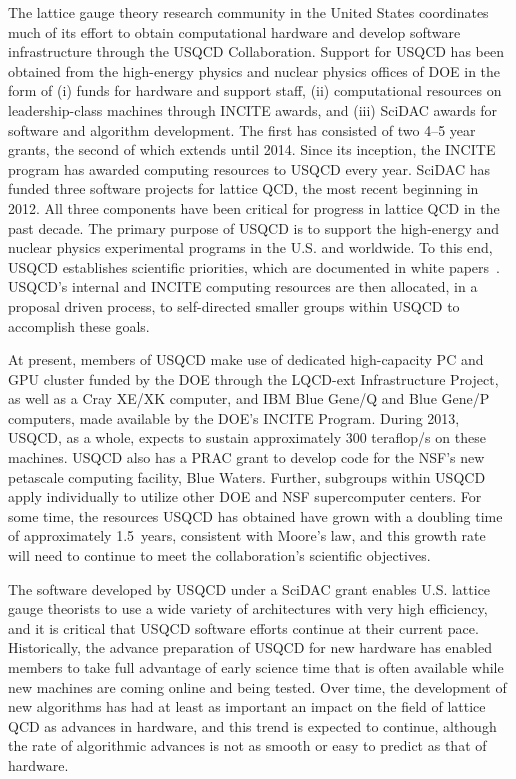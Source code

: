 The lattice gauge theory research community in the United States coordinates much of its effort to obtain
computational hardware and develop software infrastructure through the USQCD Collaboration.
Support for USQCD has been obtained from the high-energy physics and nuclear physics offices of DOE in the
form of (i) funds for hardware and support staff, (ii) computational resources on leadership-class machines
through INCITE awards, and (iii) SciDAC awards for software and algorithm development.
The first has consisted of two 4--5 year grants, the second of which extends until 2014.
Since its inception, the INCITE program has awarded computing resources to USQCD every year.
SciDAC has funded three software projects for lattice QCD, the most recent beginning in 2012.
All three components have been critical for progress in lattice QCD in the past decade.
The primary purpose of USQCD is to support the high-energy and nuclear physics experimental programs in the
U.S. and worldwide.
To this end, USQCD establishes scientific priorities, which are documented in white papers~\cite{USQCD_EF_whitepaper13,USQCD_IF_whitepaper13,USQCD_NP_whitepaper13,USQCD_Thermo_whitepaper13}.
USQCD's internal and INCITE computing resources are then allocated, in a proposal driven process, to
self-directed smaller groups within USQCD to accomplish these goals.

At present, members of USQCD make use of dedicated high-capacity PC and GPU cluster funded by the DOE through the LQCD-ext
Infrastructure Project, as well as a Cray XE/XK computer, and IBM Blue Gene/Q and Blue Gene/P computers, made
available by the DOE's INCITE Program.
During 2013, USQCD, as a whole, expects to sustain approximately 300 teraflop/s on these machines.
USQCD also has a PRAC grant to develop code for the NSF's new petascale computing facility, Blue Waters.
Further, subgroups within USQCD apply individually to utilize other DOE and NSF supercomputer centers.
For some time, the resources USQCD has obtained have grown with a doubling time of approximately 1.5~years,
consistent with Moore's law, and this growth rate will need to continue to meet the collaboration's scientific objectives.
 
The software developed by USQCD under a SciDAC grant enables U.S. lattice gauge theorists to use a wide variety
of architectures with very high efficiency, and it is critical that USQCD software efforts continue at their
current pace.
Historically, the advance preparation of USQCD for new hardware has enabled members to take full advantage of
early science time that is often available while new machines are coming online and being tested.
Over time, the development of new algorithms has had at least as important an impact on the field of lattice
QCD as advances in hardware, and this trend is expected to continue, although the rate of algorithmic
advances is not as smooth or easy to predict as that of hardware.

